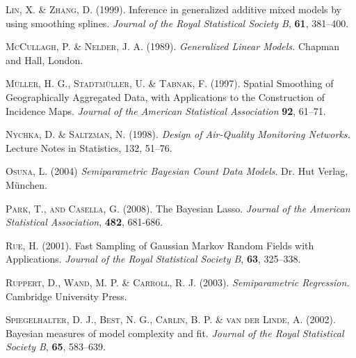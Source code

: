 \documentclass[11pt,a4paper,twoside]{bayesxarticle}
\begin{document}
\begin{thebibliography}{99}
 {\scshape Lin, X. \& Zhang, D.} (1999).
 Inference in generalized additive mixed models by using smoothing splines.
 {\it Journal of the Royal Statistical Society B}, {\bf 61}, 381--400.

 {\scshape McCullagh, P. \& Nelder, J. A.} (1989).
 {\it Generalized Linear Models.}
 Chapman and Hall, London.

 {\scshape M\"{u}ller, H. G., Stadtm\"{u}ller, U. \& Tabnak, F.} (1997).
 Spatial Smoothing of Geographically Aggregated Data, with Applications to the Construction of Incidence Maps.
 {\it Journal of the American Statistical Association} {\bf 92}, 61--71.

 {\scshape Nychka, D. \& Saltzman, N.} (1998).
 {\it Design of Air-Quality Monitoring Networks.}
 Lecture Notes in Statistics, 132, 51--76.

 {\scshape Osuna, L.} (2004)
 {\it Semiparametric Bayesian Count Data Models}.
 Dr. Hut Verlag, M\"{u}nchen.

 {\scshape Park, T., and Casella, G.} (2008). The Bayesian Lasso.
 {\it Journal of the American Statistical Association}, {\bf 482}, 681-686.

 {\scshape Rue, H.} (2001).
 Fast Sampling of Gaussian Markov Random Fields with Applications.
 {\it Journal of the Royal Statistical Society B}, {\bf 63}, 325--338.

 {\scshape Ruppert, D., Wand, M. P. \& Carroll, R. J.} (2003).
 {\it Semiparametric Regression.}
 Cambridge University Press.

 {\scshape Spiegelhalter, D. J., Best, N. G., Carlin, B. P. \& van der Linde, A.} (2002).
 Bayesian measures of model complexity and fit.
 {\it Journal of the Royal Statistical Society B}, {\bf 65}, 583--639.

\end{thebibliography}


\hypertarget{index}{}
\end{document}
